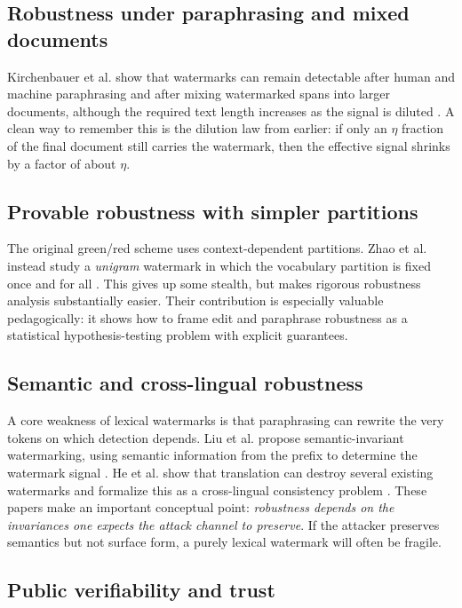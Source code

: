 \documentclass[11pt]{article}
\theoremstyle{definition}
\newcommand{\1}{\mathbf{1}}
\begin{document}
\subsection{Robustness under paraphrasing and mixed documents}

Kirchenbauer et al. show that watermarks can remain detectable after human and machine paraphrasing and after mixing watermarked spans into larger documents, although the required text length increases as the signal is diluted \cite{kirchenbauer2024reliability}. A clean way to remember this is the dilution law from earlier: if only an $\eta$ fraction of the final document still carries the watermark, then the effective signal shrinks by a factor of about $\eta$.

\subsection{Provable robustness with simpler partitions}

The original green/red scheme uses context-dependent partitions. Zhao et al. instead study a \emph{unigram} watermark in which the vocabulary partition is fixed once and for all \cite{zhao2024provable}. This gives up some stealth, but makes rigorous robustness analysis substantially easier. Their contribution is especially valuable pedagogically: it shows how to frame edit and paraphrase robustness as a statistical hypothesis-testing problem with explicit guarantees.

\subsection{Semantic and cross-lingual robustness}

A core weakness of lexical watermarks is that paraphrasing can rewrite the very tokens on which detection depends. Liu et al. propose semantic-invariant watermarking, using semantic information from the prefix to determine the watermark signal \cite{liu2024sir}. He et al. show that translation can destroy several existing watermarks and formalize this as a cross-lingual consistency problem \cite{he2024translation}. These papers make an important conceptual point: \emph{robustness depends on the invariances one expects the attack channel to preserve}. If the attacker preserves semantics but not surface form, a purely lexical watermark will often be fragile.

\subsection{Public verifiability and trust}
\end{document}
